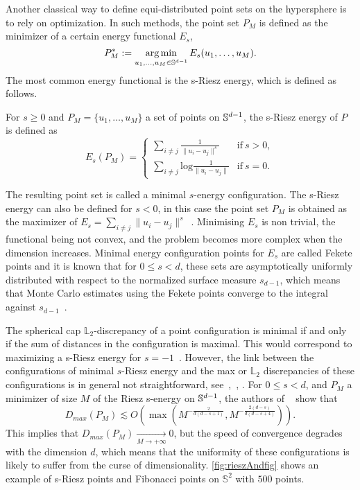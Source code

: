 Another classical way to define equi-distributed point sets on the hypersphere is to rely on optimization. In such methods, the point set $P_M$ is defined as the minimizer of a certain energy functional $E_s$,
\begin{equation*}
    P^*_M := \operatorname*{arg\,min}_{u_1,\hdots,u_M \in \mathbb{S}^{d-1}} E_s(u_1,\hdots, u_M).
\end{equation*}
The most common energy functional is the s-Riesz energy, which is defined as follows. 
\begin{D}
For $s \geq 0$ and $P_M = \{ u_1, \hdots, u_M\}$ a set of points on $\mathbb{S}^{d-1}$, the s-Riesz energy of $P$ is defined as
\begin{equation*}
E_s(P_M) = 
\begin{cases}
\displaystyle\sum\limits_{i\neq j} \frac{1}{\| u_i - u_j\|^s} & \text{if} \ s > 0,\\
\displaystyle\sum\limits_{i\neq j} \text{log} \frac{1}{\| u_i - u_j\|} & \text{if} \ s = 0.
\end{cases}
\end{equation*}
\end{D}

The resulting point set is called a minimal $s$-energy configuration. {The s-Riesz energy can also be defined for $s < 0$, in this case the point set $P_M$ is obtained as the maximizer of $E_s= \displaystyle\sum\limits_{i\neq j} \| u_i - u_j\|^s$~\citep{brauchart2011optimal}.} Minimising $E_s$  is non trivial, the functional being not convex, and the problem becomes more complex when the dimension increases. 
Minimal energy configuration points for $E_s$ are called Fekete points and it is known that for $0\leq s < d$, these sets are asymptotically uniformly distributed with respect to the normalized surface measure $s_{d-1}$, which means that Monte Carlo estimates using the Fekete points converge to the integral against $s_{d-1}$~\citep{marzo2021discrepancy}. 

The spherical cap $\mathbb{L}_2$-discrepancy of a point configuration is minimal if and only if the sum of distances in the configuration is maximal. {This would correspond to maximizing a s-Riesz energy for $s=-1$~\citep{brauchart2011optimal}}. However, the link between the configurations of minimal $s$-Riesz energy and the max or $\mathbb{L}_2$ discrepancies of these configurations is in general not straightforward, see~\citep{brauchart2011optimal},~\citep{marzo2021discrepancy}, \citep{GOTZ200362}. For $0\leq s <d$, and $P_M$ a minimizer of size $M$ of the Riesz s-energy on $\mathbb{S}^{d-1}$, the authors of ~\citep{marzo2021discrepancy} show that {\[D_{max}(P_M) \lesssim O\left(\max\left(M^{-\frac{2}{d(d-s+1)}},M^{-\frac{2(d-s)}{d(d-s+4)}}\right)\right).\]  
This implies that $D_{max}(P_M) \xrightarrow[M \to +\infty]{} 0$, but the speed of convergence degrades with the dimension $d$}, which means that  the uniformity of these configurations  
{is}
 likely to suffer from the curse of dimensionality. \autoref{fig:rieszAndfig} shows an example of s-Riesz points and Fibonacci points on $\mathbb{S}^2$ with $500$ points.

